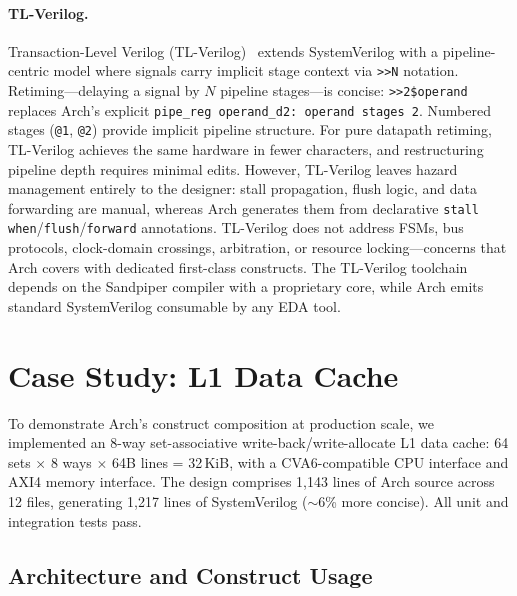 \documentclass[11pt,twocolumn]{article}
\begin{document}
\paragraph{TL-Verilog.}
Transaction-Level Verilog (TL-Verilog)~\cite{tlverilog} extends SystemVerilog with a pipeline-centric model where signals carry implicit stage context via \texttt{>>N} notation. Retiming---delaying a signal by $N$ pipeline stages---is concise: \texttt{>>2\$operand} replaces Arch's explicit \texttt{pipe\_reg operand\_d2: operand stages 2}. Numbered stages (\texttt{@1}, \texttt{@2}) provide implicit pipeline structure. For pure datapath retiming, TL-Verilog achieves the same hardware in fewer characters, and restructuring pipeline depth requires minimal edits.
However, TL-Verilog leaves hazard management entirely to the designer: stall propagation, flush logic, and data forwarding are manual, whereas Arch generates them from declarative \texttt{stall when}/\texttt{flush}/\texttt{forward} annotations. TL-Verilog does not address FSMs, bus protocols, clock-domain crossings, arbitration, or resource locking---concerns that Arch covers with dedicated first-class constructs. The TL-Verilog toolchain depends on the Sandpiper compiler with a proprietary core, while Arch emits standard SystemVerilog consumable by any EDA tool.

\section{Case Study: L1 Data Cache}\label{sec:example}

To demonstrate Arch's construct composition at production scale, we implemented an 8-way set-associative write-back/write-allocate L1 data cache: 64 sets $\times$ 8 ways $\times$ 64B lines = 32\,KiB, with a CVA6-compatible CPU interface and AXI4 memory interface. The design comprises 1,143 lines of Arch source across 12 files, generating 1,217 lines of SystemVerilog (${\sim}$6\% more concise). All unit and integration tests pass.

\subsection{Architecture and Construct Usage}
\end{document}
